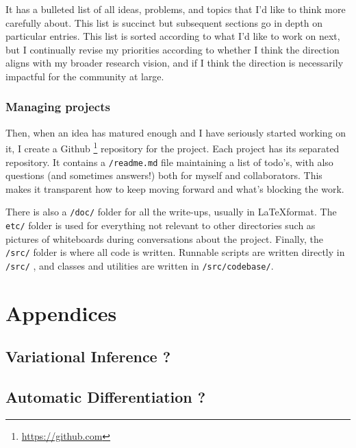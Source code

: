 \documentclass[twoside,10pt,openany,a4paper]{rapport}
\begin{document}
It has a bulleted list of all ideas, problems, and topics that I’d like to think more carefully about. This list is succinct but subsequent sections go in depth on particular entries.
This list is sorted according to what I’d like to work on next, but I continually revise my priorities according to whether I think the direction aligns with my broader research vision, and if I think the direction is necessarily impactful for the community at large.

\subsection{Managing projects}
Then, when an idea has matured enough and I have seriously started working on it, I create a Github \footnote{\url{https://github.com}} repository for the project. Each project has its separated repository. 
It contains a \texttt{/readme.md} file maintaining a list of todo’s, with also questions (and sometimes answers!) both for myself and collaborators. This makes it transparent how to keep moving forward and what’s blocking the work.

There is also a \texttt{/doc/} folder for all the write-ups, usually in \LaTeX  format.
The  \texttt{etc/} folder is used for everything not relevant to other directories such as pictures of whiteboards during conversations about the project.
Finally, the \texttt{/src/} folder is where all code is written. Runnable scripts are written directly in \texttt{/src/} , and classes and utilities are written in \texttt{/src/codebase/}. 


















\appendix
\chapter*{Appendices}
\renewcommand{\thesection}{\Alph{section}}
\section{Variational Inference ?}
\section{Automatic Differentiation ?}

\nocite{*}



\end{document}
